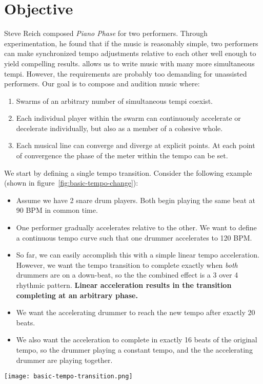 \section{Objective}
\label{sec:polytempic-objective}
Steve Reich composed \textit{Piano Phase} for two performers. Through
experimentation, he found that if the music is reasonably simple, two
performers can make synchronized tempo adjustments relative to each
other well enough to yield compelling results. \polytempic allows us
to write music with many more simultaneous tempi. However, the
requirements are probably too demanding for unassisted performers. Our
goal is to compose and audition music where:
\begin{enumerate}
  \item Swarms of an arbitrary number of simultaneous tempi
    coexist. 
  \item Each individual player within the swarm can continuously
    accelerate or decelerate individually, but also as a member of a
    cohesive whole. 
  \item Each musical line can converge and diverge at explicit
    points. At each point of convergence the phase of the meter within
    the tempo can be set.
\end{enumerate}
We start by defining a single tempo transition. Consider the following
example (shown in figure~\ref{fig:basic-tempo-change}):
\begin{itemize}
\item Assume we have 2 snare drum players. Both begin playing the same
  beat at 90 BPM in common time.
\item One performer gradually accelerates relative to the other. We want
  to define a continuous tempo curve such that one drummer accelerates
  to 120 BPM.
\item So far, we can easily accomplish this with a simple linear tempo
  acceleration. However, we want the tempo transition to complete
  exactly when \emph{both} drummers are on a down-beat, so the the
  combined effect is a 3 over 4 rhythmic pattern. \textbf{Linear
    acceleration results in the transition completing at an arbitrary
    phase.}
\item We want the accelerating drummer to reach the new tempo after
  exactly 20 beats.
\item We also want the acceleration to complete in exactly 16 beats of
  the original tempo, so the drummer playing a constant tempo, and the
  the accelerating drummer are playing together.
\end{itemize}
\begin{figure*}[h]
  \texttt{[image: basic-tempo-transition.png]}
  \caption[Tempo Transition]{Tempo Transition from 90~BPM
    to 120~BPM}
  \label{fig:basic-tempo-change}
\end{figure*}

